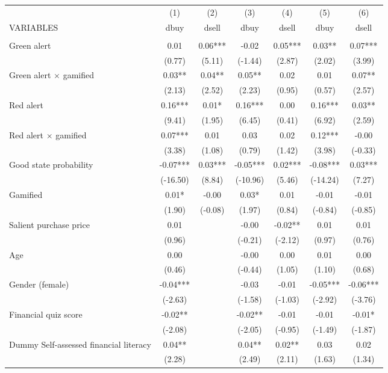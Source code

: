 \documentclass[]{article}
\begin{document}
\begin{tabular}{lcccccc} \hline
 & (1) & (2) & (3) & (4) & (5) & (6) \\
VARIABLES & dbuy & dsell & dbuy & dsell & dbuy & dsell \\ \hline
 &  &  &  &  &  &  \\
Green alert & 0.01 & 0.06*** & -0.02 & 0.05*** & 0.03** & 0.07*** \\
 & (0.77) & (5.11) & (-1.44) & (2.87) & (2.02) & (3.99) \\
Green alert $\times$ gamified & 0.03** & 0.04** & 0.05** & 0.02 & 0.01 & 0.07** \\
 & (2.13) & (2.52) & (2.23) & (0.95) & (0.57) & (2.57) \\
Red alert & 0.16*** & 0.01* & 0.16*** & 0.00 & 0.16*** & 0.03** \\
 & (9.41) & (1.95) & (6.45) & (0.41) & (6.92) & (2.59) \\
Red alert $\times$ gamified & 0.07*** & 0.01 & 0.03 & 0.02 & 0.12*** & -0.00 \\
 & (3.38) & (1.08) & (0.79) & (1.42) & (3.98) & (-0.33) \\
Good state probability & -0.07*** & 0.03*** & -0.05*** & 0.02*** & -0.08*** & 0.03*** \\
 & (-16.50) & (8.84) & (-10.96) & (5.46) & (-14.24) & (7.27) \\
Gamified & 0.01* & -0.00 & 0.03* & 0.01 & -0.01 & -0.01 \\
 & (1.90) & (-0.08) & (1.97) & (0.84) & (-0.84) & (-0.85) \\
Salient purchase price & 0.01 &  & -0.00 & -0.02** & 0.01 & 0.01 \\
 & (0.96) &  & (-0.21) & (-2.12) & (0.97) & (0.76) \\
Age & 0.00 &  & -0.00 & 0.00 & 0.01 & 0.00 \\
 & (0.46) &  & (-0.44) & (1.05) & (1.10) & (0.68) \\
Gender (female) & -0.04*** &  & -0.03 & -0.01 & -0.05*** & -0.06*** \\
 & (-2.63) &  & (-1.58) & (-1.03) & (-2.92) & (-3.76) \\
Financial quiz score & -0.02** &  & -0.02** & -0.01 & -0.01 & -0.01* \\
 & (-2.08) &  & (-2.05) & (-0.95) & (-1.49) & (-1.87) \\
Dummy Self-assessed financial literacy & 0.04** &  & 0.04** & 0.02** & 0.03 & 0.02 \\
 & (2.28) &  & (2.49) & (2.11) & (1.63) & (1.34) \\

\end{tabular}
\end{document}
